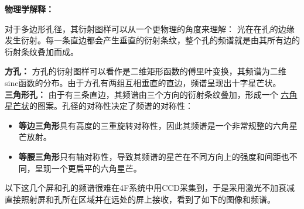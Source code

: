 \documentclass[12pt]{article}
\begin{document}
\textbf{物理学解释：}
\par
对于多边形孔径，其衍射图样可以从一个更物理的角度来理解： 光在在孔的边缘发生衍射。每一条直边都会产生垂直的衍射条纹，整个孔的频谱就是由其所有边的衍射条纹叠加而成。
\par
\vspace{1em}
\textbf{方孔：} 方孔的衍射图样可以看作是二维矩形函数的傅里叶变换，其频谱为二维sinc函数的分布。由于方孔有两组互相垂直的直边，频谱呈现出十字星芒状。 \\
\textbf{三角形孔：} 由于有三条直边，其频谱由三个方向的衍射条纹叠加，形成一个 \underline{六角星芒状}的图案。孔径的对称性决定了频谱的对称性：
\begin{itemize}
        \item \textbf{等边三角形}具有高度的三重旋转对称性，因此其频谱是一个非常规整的六角星芒放射。
        \item \textbf{等腰三角形}只有轴对称性，导致其频谱的星芒在不同方向上的强度和间距也不同，呈现一个更扁平的六角星芒。
\end{itemize}

\par
以下这几个屏和孔的频谱很难在4F系统中用CCD采集到，于是采用激光不加衰减直接照射屏和孔所在区域并在远处的屏上接收，看到了如下的图像和频谱。
\end{document}
